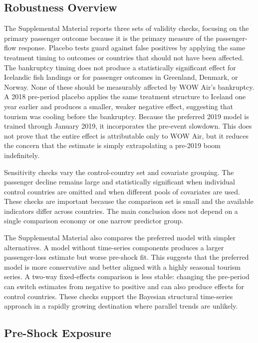 \documentclass[12pt]{article}
\begin{document}
\subsection{Robustness Overview}\label{sec:robustness_overview}

The Supplemental Material reports three sets of validity checks, focusing on the primary passenger outcome because it is the primary measure of the passenger-flow response. Placebo tests guard against false positives by applying the same treatment timing to outcomes or countries that should not have been affected. The bankruptcy timing does not produce a statistically significant effect for Icelandic fish landings or for passenger outcomes in Greenland, Denmark, or Norway. None of these should be measurably affected by WOW Air's bankruptcy. A 2018 pre-period placebo applies the same treatment structure to Iceland one year earlier and produces a smaller, weaker negative effect, suggesting that tourism was cooling before the bankruptcy. Because the preferred 2019 model is trained through January 2019, it incorporates the pre-event slowdown. This does not prove that the entire effect is attributable only to WOW Air, but it reduces the concern that the estimate is simply extrapolating a pre-2019 boom indefinitely.

Sensitivity checks vary the control-country set and covariate grouping. The passenger decline remains large and statistically significant when individual control countries are omitted and when different pools of covariates are used. These checks are important because the comparison set is small and the available indicators differ across countries. The main conclusion does not depend on a single comparison economy or one narrow predictor group.

The Supplemental Material also compares the preferred model with simpler alternatives. A model without time-series components produces a larger passenger-loss estimate but worse pre-shock fit. This suggests that the preferred model is more conservative and better aligned with a highly seasonal tourism series. A two-way fixed-effects comparison is less stable: changing the pre-period can switch estimates from negative to positive and can also produce effects for control countries. These checks support the Bayesian structural time-series approach in a rapidly growing destination where parallel trends are unlikely.

\subsection{Pre-Shock Exposure}\label{sec:pre_shock_exposure}
\end{document}
